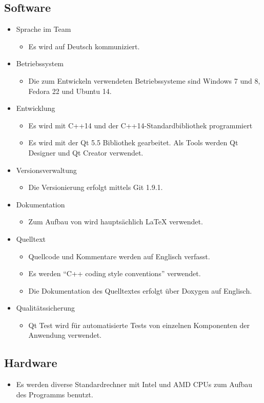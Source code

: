 \subsection{Software}
\begin{itemize}
\item Sprache im Team
	\begin{itemize}[label={--}]
		\item Es wird auf Deutsch kommuniziert.
	\end{itemize}
\item Betriebssystem
	\begin{itemize}[label={--}]
		\item Die zum Entwickeln verwendeten Betriebssysteme sind Windows 7 und 8, Fedora 22 und Ubuntu 14.
	\end{itemize}
\item Entwicklung
	\begin{itemize}[label={--}]
		\item Es wird mit C++14 und der C++14-Standardbibliothek programmiert
		\item Es wird mit der \gls{Qt} 5.5 Bibliothek gearbeitet. Als Tools werden \gls{Qt Designer} und \gls{Qt Creator} verwendet.
	\end{itemize}
\item \gls{Versionsverwaltung}
	\begin{itemize}[label={--}]
		\item Die Versionierung erfolgt mittels \gls{Git} 1.9.1.
	\end{itemize}
\item Dokumentation
	\begin{itemize}[label={--}]
		\item Zum Aufbau von  wird hauptsächlich LaTeX verwendet.
	\end{itemize}
\item Quelltext
	\begin{itemize}[label={--}]
		\item Quellcode und Kommentare werden auf Englisch verfasst.
		\item Es werden \enquote{C++ coding style conventions} verwendet.
		\item Die Dokumentation des Quelltextes erfolgt über \gls{Doxygen} auf Englisch.
	\end{itemize}
\item Qualitätssicherung
	\begin{itemize}[label={--}]
		\item \gls{Qt Test} wird für automatisierte Tests von einzelnen Komponenten der Anwendung verwendet.
	\end{itemize}

\end{itemize}

\subsection{Hardware}
\begin{itemize}
	\item Es werden diverse Standardrechner mit Intel und AMD CPUs zum Aufbau des Programms benutzt.
\end{itemize}
\pagebreak
